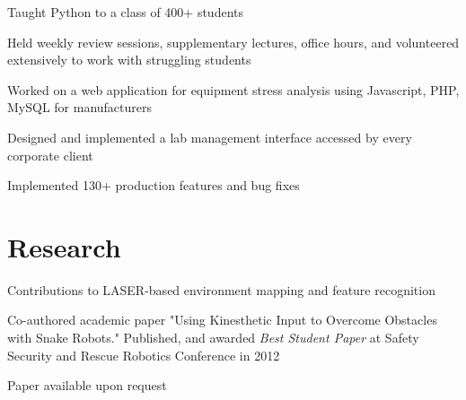 \documentclass[letterpaper]{deedy-resume}
\begin{document}
\begin{minipage}[t]{0.66\textwidth}
        \begin{tightitemize}
          \item Taught Python to a class of 400+ students
          \item Held weekly review sessions, supplementary lectures, office
            hours, and volunteered extensively to work with struggling students
        \end{tightitemize}

      \vspace{2pt}


        \begin{tightitemize}
          \item Worked on a web application for equipment stress analysis
            using Javascript, PHP, MySQL for manufacturers
          \item Designed and implemented a lab management interface
            accessed by every corporate client
          \item Implemented 130+ production features and bug fixes
        \end{tightitemize}

    \sectionspace

    \section{Research}

        \begin{tightitemize}
          \item Contributions to LASER-based environment mapping and feature
            recognition
          \item Co-authored academic paper
            "Using Kinesthetic Input to Overcome Obstacles with Snake Robots."
            Published, and awarded \textit{Best Student Paper} at Safety
            Security and Rescue Robotics Conference in 2012
          \item Paper available upon request
        \end{tightitemize}

    \sectionspace


\end{minipage}
\end{document}
